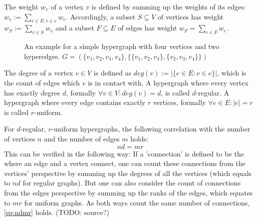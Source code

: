 The weight $w_v$ of a vertex $v$ is defined by summing up the weights of its edges: $w_v := \sum_{e\in E: v\in e} w_e$. Accordingly, a subset $S\subseteq V$ of vertices has weight $w_S := \sum_{v\in S} w_v$ and a subset $F \subseteq E $ of edges has weight $w_F = \sum_{e\in F} w_e$.

	
\begin{figure} [htpb]
	\centering
	\caption[Example hypergraph]{An example for a simple hypergraph with four vertices and two hyperedges. $G=(\{v_1, v_2, v_3, v_4\},\{\{v_1, v_2, v_3\}, \{v_2,v_3, v_4\}\} )$}\label{fig:exapmlehypergraph}
\end{figure}


The degree of a vertex $v\in V$ is defined as $deg(v) := |\{e\in E: v\in e\}|$, which is the count of edges which $v$ is in contact with.
A hypergraph where every vertex has exactly degree $d$, formally $\forall v\in V : deg(v) =d $,  is called $d$-regular. 
A hypergraph where every edge contains exactly $r$ vertices, formally $\forall e\in E : |e| =r $ is called $r$-uniform.

For $d$-regular, $r$-uniform hypergraphs, the following correlation with the number of vertices $n$ and the number of edges $m$ holds:
\begin{equation}\label{eq:ndmr}
	 n d = m r
\end{equation}
 This can be verified in the following way: If a 'connection' is defined to be the where an edge and a vertex connect, one can count these connections from the vertices' perspective by summing up the degrees of all the vertices (which equals to $nd$ for regular graphs). But one can also consider the count of connections from the edges perspective by summing up the ranks of the edges, which equates to $mr$ for uniform graphs. As both ways count the same number of connections, \cref{eq:ndmr} holds. (TODO: source?)
 
